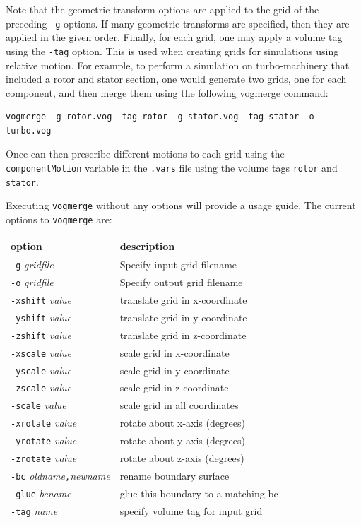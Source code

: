 \documentclass{article}
\begin{document}
Note that the geometric transform options are applied to the grid of
the preceding {\tt -g} options.  If many geometric transforms are
specified, then they are applied in the given order.  Finally, for
each grid, one may apply a volume tag using the {\tt -tag} option.
This is used when creating grids for simulations using relative
motion.  For example, to perform a simulation on turbo-machinery that
included a rotor and stator section, one would generate two grids, one
for each component, and then merge them using the following vogmerge
command:
\begin{verbatim}
vogmerge -g rotor.vog -tag rotor -g stator.vog -tag stator -o turbo.vog
\end{verbatim}
Once can then prescribe different motions to each grid using the {\tt
  componentMotion} variable in the {\tt .vars} file using the volume tags
{\tt rotor} and {\tt stator}.

Executing {\tt vogmerge} without any options will provide a usage guide.
The current options to {\tt vogmerge} are:

\begin{table}[htbp]
\begin{center}
\begin{tabular} {|l|l|}
\hline
option & description\\
\hline\hline
  {\tt -g} {\it gridfile}           & Specify input grid filename \\
  {\tt -o} {\it gridfile}           & Specify output grid filename \\
  {\tt -xshift} {\it value}         & translate grid in x-coordinate\\
  {\tt -yshift} {\it value}         & translate grid in y-coordinate\\
  {\tt -zshift} {\it value}         & translate grid in z-coordinate\\
  {\tt -xscale} {\it value}         & scale grid in x-coordinate\\
  {\tt -yscale} {\it value}         & scale grid in y-coordinate\\
  {\tt -zscale} {\it value}         & scale grid in z-coordinate\\
  {\tt -scale}  {\it value}         & scale grid in all coordinates\\
  {\tt -xrotate} {\it value}        & rotate about x-axis (degrees)\\
  {\tt -yrotate} {\it value}        & rotate about y-axis (degrees)\\
  {\tt -zrotate} {\it value}        & rotate about z-axis (degrees)\\
  {\tt -bc} {\it oldname}{\tt ,}{\it newname} & rename boundary surface\\
  {\tt -glue} {\it bcname}          & glue this boundary to a matching bc\\
  {\tt -tag} {\it name}             & specify volume tag for input grid\\
\hline
\end{tabular}
\end{center}
\end{table}
\end{document}

